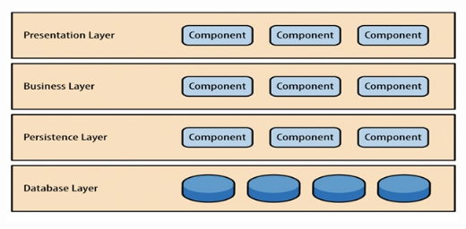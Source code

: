 \documentclass[a4paper,12pt]{article}
\begin{document}
\includegraphics{Img/Design Pattern 2.png}
\end{document}

